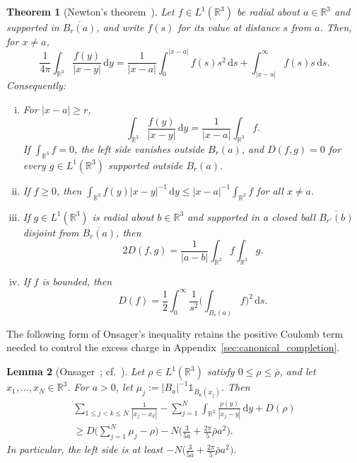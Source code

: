 \documentclass[final,reqno]{amsart}
\newtheorem{theorem}{Theorem}[section]
\newtheorem{lemma}[theorem]{Lemma}
\theoremstyle{remark}
\theoremstyle{definition}
\renewcommand{\le}{\leqslant}
\renewcommand{\ge}{\geqslant}
\newcommand{\RR}{\mathbb{R}}
\newcommand{\iden}{\mathbb{1}}
\begin{document}
\begin{theorem}[{Newton's theorem~\cite[Thm.~5.2]{lieb2010stability}}]\label{thm:basic_newton}
Let $f\in L^1(\RR^3)$ be radial about $a\in\RR^3$ and supported in $\overline{B_r(a)}$, and write $f(s)$ for its value at distance $s$ from $a$. Then, for $x\ne a$,
\begin{equation}\label{eq:basic_newton}
\frac{1}{4\pi}\int_{\RR^3}\frac{f(y)}{|x-y|}\,\mathrm dy=\frac1{|x-a|}\int_0^{|x-a|}f(s)s^2\,\mathrm ds+\int_{|x-a|}^\infty f(s)s\,\mathrm ds.
\end{equation}
Consequently:
\begin{enumerate}[(i)]
\item For $|x-a|\ge r$,
\[
\int_{\RR^3}\frac{f(y)}{|x-y|}\,\mathrm dy=\frac1{|x-a|}\int_{\RR^3}f.
\]
If $\int_{\RR^3}f=0$, the left side vanishes outside $B_r(a)$, and $D(f,g)=0$ for every $g\in L^1(\RR^3)$ supported outside $B_r(a)$.
\item If $f\ge0$, then $\int_{\RR^3}f(y)|x-y|^{-1}\,\mathrm dy\le|x-a|^{-1}\int_{\RR^3}f$ for all $x\ne a$.
\item If $g\in L^1(\RR^3)$ is radial about $b\in\RR^3$ and supported in a closed ball $\overline{B_{r'}(b)}$ disjoint from $\overline{B_r(a)}$, then
\begin{equation}\label{eq:basic_radial_cross}
2D(f,g)=\frac1{|a-b|}\int_{\RR^3}f\int_{\RR^3}g.
\end{equation}
\item If $f$ is bounded, then
\[
D(f)=\frac12\int_0^\infty\frac1{s^2}\Big(\int_{B_s(a)}f\Big)^2\,\mathrm ds.
\]
\end{enumerate}
\end{theorem}

The following form of Onsager's inequality retains the positive Coulomb term needed to control the excess charge in Appendix~\ref{sec:canonical_completion}.

\begin{lemma}[{Onsager~\cite{onsager1939electrostatic}; cf.~\cite[Lemma~6.1]{lieb2010stability}}]\label{lem:basic_onsager}
Let $\rho\in L^1(\RR^3)$ satisfy $0\le\rho\le\bar\rho$, and let $x_1,\dots,x_N\in\RR^3$. For $a>0$, let $\mu_j:=|B_a|^{-1}\iden_{B_a(x_j)}$. Then
\begin{multline*}
\sum_{1\le j<k\le N}\frac1{|x_j-x_k|}-\sum_{j=1}^N\int_{\RR^3}\frac{\rho(y)}{|x_j-y|}\,\mathrm dy+D(\rho)\\
\ge D\Big(\sum_{j=1}^N\mu_j-\rho\Big)-N\Big(\frac3{5a}+\frac{2\pi}5\bar\rho a^2\Big).
\end{multline*}
In particular, the left side is at least $-N\big(\frac3{5a}+\frac{2\pi}5\bar\rho a^2\big)$.
\end{lemma}
\end{document}
